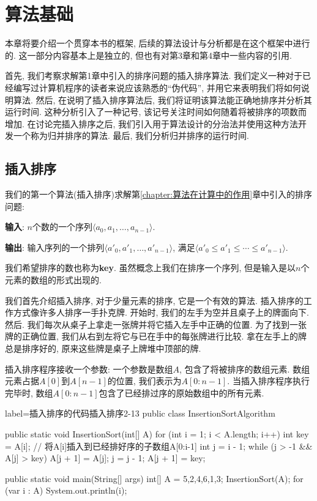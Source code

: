 \documentclass[oneside,10pt,fontset=none]{ctexbook}
\numberwithin{definition}{chapter}
\numberwithin{theorem}{chapter}
\numberwithin{lemma}{chapter}
\begin{document}
\chapter{算法基础}\label{chapter:算法基础}

本章将要介绍一个贯穿本书的框架, 后续的算法设计与分析都是在这个框架中进行的. 这一部分内容基本上是独立的, 但也有对第3章和第4章中一些内容的引用.

首先, 我们考察求解第1章中引入的排序问题的插入排序算法. 我们定义一种对于已经编写过计算机程序的读者来说应该熟悉的``伪代码'', 并用它来表明我们将如何说明算法. 然后, 在说明了插入排序算法后, 我们将证明该算法能正确地排序并分析其运行时间. 这种分析引入了一种记号, 该记号关注时间如何随着将被排序的项数而增加. 在讨论完插入排序之后, 我们引入用于算法设计的分治法并使用这种方法开发一个称为归并排序的算法. 最后, 我们分析归并排序的运行时间.

\section{插入排序}

我们的第一个算法(插入排序)求解第\ref{chapter:算法在计算中的作用}章中引入的排序问题:

\textbf{输入}: $n$个数的一个序列$\langle a_0, a_1, \dots, a_{n-1}\rangle$.

\textbf{输出}: 输入序列的一个排列$\langle a'_0, a'_1, \dots, a'_{n-1}\rangle$, 满足$\langle a'_0\leq a'_1\leq\cdots\leq a'_{n-1}\rangle$.

我们希望排序的数也称为\textbf{key}. 虽然概念上我们在排序一个序列, 但是输入是以$n$个元素的数组的形式出现的.

我们首先介绍插入排序, 对于少量元素的排序, 它是一个有效的算法. 插入排序的工作方式像许多人排序一手扑克牌. 开始时, 我们的左手为空并且桌子上的牌面向下. 然后. 我们每次从桌子上拿走一张牌并将它插入左手中正确的位置. 为了找到一张牌的正确位置, 我们从右到左将它与已在手中的每张牌进行比较. 拿在左手上的牌总是排序好的, 原来这些牌是桌子上牌堆中顶部的牌.

插入排序程序接收一个参数: 一个参数是数组$A$, 包含了将被排序的数组元素. 数组元素占据$A[0]$到$A[n-1]$的位置, 我们表示为$A[0:n-1]$. 当插入排序程序执行完毕时, 数组$A[0:n-1]$包含了已经排过序的原始数组中的所有元素.

\begin{myjava}{label={插入排序的代码}}{插入排序}{2-13}
public class InsertionSortAlgorithm {
    public static void InsertionSort(int[] A) {
        for (int i = 1; i < A.length; i++) {
            int key = A[i];
            // 将A[i]插入到已经排好序的子数组A[0:i-1]
            int j = i - 1;
            while (j > -1 && A[j] > key) {
                A[j + 1] = A[j];
                j = j - 1;
            }
            A[j + 1] = key;
        }
    }

    public static void main(String[] args) {
        int[] A = {5,2,4,6,1,3};
        InsertionSort(A);
        for (var i : A)
            System.out.println(i);
    }
}
\end{myjava}
\end{document}
